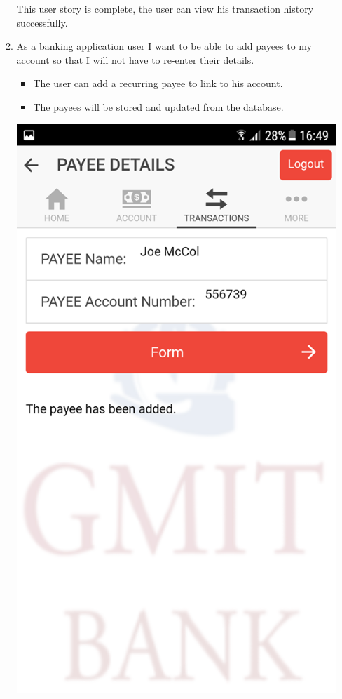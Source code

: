 \begin{itemize}
\begin{enumerate}
\begin{center}
\end{center}
        This user story is complete, the user can view his transaction history successfully.
        \item As a banking application user I want to be able to add payees to my account so that I will not have to re-enter their details.
            \begin{itemize}
                \item The user can add a recurring payee to link to his account.
                \item The payees will be stored and updated from the database.
            \end{itemize}
\begin{center}    
    \includegraphics[scale=0.5]{img/15payeeadded.png}

\end{center}
\end{enumerate}
\end{itemize}

